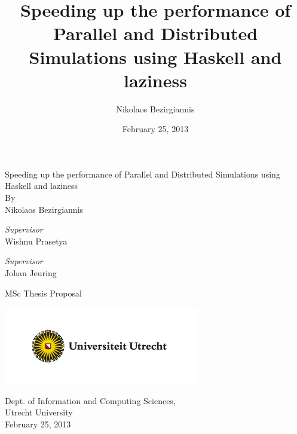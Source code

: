 \documentclass[a4paper]{article}
\title{Speeding up the performance of Parallel and Distributed Simulations using Haskell and laziness}
\author{Nikolaos Bezirgiannis}
\date{February 25, 2013}
\begin{document}
\begin{titlepage}
  \begin{center}

    {\LARGE Speeding up the performance of Parallel and Distributed Simulations
    using Haskell and laziness}\\[0.5cm]

    {\Large By}\\
    {\Large Nikolaos Bezirgiannis}\\[1.5cm]

    \begin{minipage}{0.8\linewidth}
      \begin{center}
    \begin{minipage}{0.4\textwidth}
      \begin{flushleft} \large
        \emph{Supervisor}\\
        Wishnu Prasetya
      \end{flushleft}
    \end{minipage}
    \begin{minipage}{0.5\textwidth}
      \begin{flushright} \large
        \emph{Supervisor}\\
        Johan Jeuring
      \end{flushright}
    \end{minipage}
    \end{center}
    \end{minipage}

    \vspace{1.5cm}

    {\Large MSc Thesis Proposal}

  \vfill
  
  \includegraphics{uu_logo}

  {\large Dept. of Information and Computing Sciences,}\\
  {\large Utrecht University}\\[1cm]

  {\large February 25, 2013}

  \end{center}


\end{titlepage}
\end{document}
